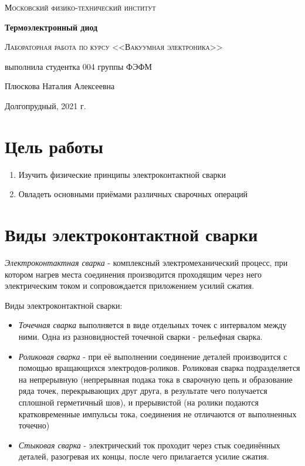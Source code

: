 \documentclass[a4paper]{article}
\begin{document}
\begin{titlepage}
	\centering
	\vspace{5cm}
	{\scshape\LARGE Московский физико-технический институт \par}
	\vspace{5cm}

	{\huge\bfseries Термоэлектронный диод \par}
	\vspace{1cm}
	{\scshape\Large Лабораторная работа по курсу <<Вакуумная электроника>>\par}
	\vspace{1cm}
	\vfill
\begin{flushright}
	{\large выполнила студентка 004 группы ФЭФМ}\par
	\vspace{0.3cm}
	{\LARGE Плюскова Наталия Алексеевна} \par

	
\end{flushright}
	

	\vfill

	Долгопрудный, 2021 г.
\end{titlepage}

\section{Цель работы}
\begin{enumerate}
    \item Изучить физические принципы электроконтактной сварки
    \item Овладеть основными приёмами различных сварочных операций
\end{enumerate}

\section{Виды электроконтактной сварки}
{\it Электроконтактная сварка} - комплексный электромеханический процесс, при котором нагрев места соединения производится проходящим через него электрическим током и сопровождается приложением усилий сжатия. \par 
Виды электроконтактной сварки:
\begin{itemize}
    \item {\it Точечная сварка} выполняется в виде отдельных точек с интервалом между ними. Одна из разновидностей точечной сварки - рельефная сварка.
    \item {\it Роликовая сварка} - при её выполнении соединение деталей производится с помощью вращающихся электродов-роликов. Роликовая сварка подразделяется на непрерывную (непрерывная подака тока в сварочную цепь и образование ряда точек, перекрывающих друг друга, в результате чего получается сплошной герметичный шов), и прерывистой (на ролики подаются кратковременные импульсы тока, соединения не отличаются от выполненных точечно)
    \item {\it Стыковая сварка} - электрический ток проходит через стык соединённых деталей, разогревая их концы, после чего прилагается усилие сжатия.
\end{itemize}
\end{document}
